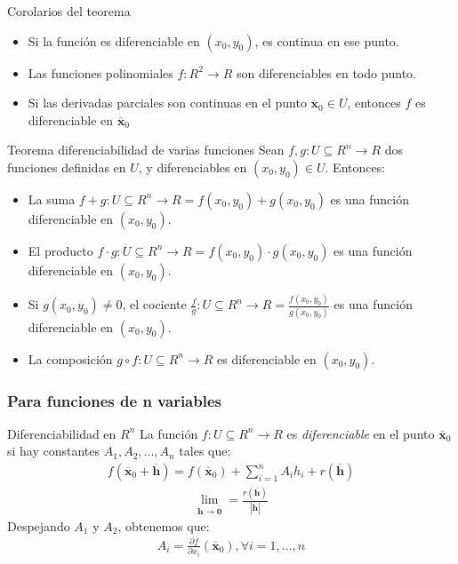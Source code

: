 \documentclass[a4paper, twoside]{article}
\numberwithin{equation}{section}
\numberwithin{figure}{section}
\numberwithin{table}{section}
\newcommand{\vect}[1]{\overline{\textbf{#1}}}
\begin{document}
\begin{corolario*}{Corolarios del teorema}
	\begin{itemize}
		\item Si la función es diferenciable en $(x_0,y_0)$, es continua en ese punto.
		\item Las funciones polinomiales $f: R^2 \rightarrow R$ son diferenciables en todo punto.
		\item Si las derivadas parciales son continuas en el punto $\vect{x}_0 \in U$, entonces $f$ es diferenciable en $\vect{x}_0$
	\end{itemize}
\end{corolario*}

\begin{teorema*}{Teorema diferenciabilidad de varias funciones}
	Sean $f,g:U\subseteq R^n \rightarrow R$ dos funciones definidas en $U$, y diferenciables en $(x_0,y_0) \in U.$ Entonces:
	\begin{itemize}
		\item La suma $f+g:U\subseteq R^n \rightarrow R=f(x_0,y_0)+g(x_0,y_0)$	es una función diferenciable en $(x_0,y_0)$.
		\item El producto $f \cdot g:U\subseteq R^n \rightarrow R=f(x_0,y_0)\cdot g(x_0,y_0)$ es una función diferenciable en $(x_0,y_0)$.
		\item Si $g(x_0,y_0) \neq 0$, el cociente $\frac{f}{g}:U\subseteq R^n \rightarrow R=\frac{f(x_0,y_0)}{g(x_0,y_0)}$ es una función diferenciable en $(x_0,y_0)$.
		\item La composición $g \circ f:U\subseteq R^n \rightarrow R$ es diferenciable en $(x_0,y_0)$.
	\end{itemize}
\end{teorema*}

\subsubsection{Para funciones de n variables} 
\begin{definicion*}{Diferenciabilidad en $R^n$}
	La función $f:U\subseteq R^n \rightarrow R$ es \emph{diferenciable} en el punto $\vect{x}_0$ si hay constantes $A_1,A_2,...,A_n$ tales que:
	\begin{align}
		f(\vect{x}_0+\vect{h})=f(\vect{x}_0)+\sum_{i=1}^{n} A_ih_i+r(\vect{h})
	\end{align}
	\begin{align}
		\lim_{\vect{h} \to \vect{0}}=\frac{r(\vect{h})}{|\vect{h}|}
	\end{align}
	Despejando $A_1$ y $A_2$, obtenemos que:
	\begin{align}
		A_i=\frac{\partial f}{\partial x_i}(\vect{x}_0), \forall i=1,...,n
	\end{align}
\end{definicion*}
\end{document}
